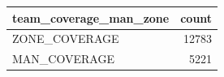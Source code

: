 \begin{tabular}{lr}
\toprule
team\_coverage\_man\_zone & count \\
\midrule
ZONE\_COVERAGE & 12783 \\
MAN\_COVERAGE & 5221 \\
\bottomrule
\end{tabular}
